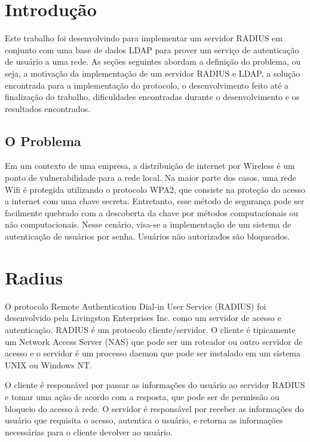 \section{Introdução}

Este trabalho foi desenvolvindo para implementar um servidor RADIUS em conjunto com uma
base de dados LDAP para prover um serviço de autenticação de usuário a uma rede.
As seções seguintes abordam a definição do problema, ou seja, a motivação da implementação
de um servidor RADIUS e LDAP, a solução encontrada para a implementação do protocolo, o
desenvolvimento feito até a finalização do trabalho, dificuldades encontradas durante o
desenvolvimento e os resultados encontrados.


\subsection{O Problema}

Em um contexto de uma empresa, a distribuição de internet por Wireless é um ponto de
vulnerabilidade para a rede local. Na maior parte dos casos, uma rede Wifi é protegida
utilizando o protocolo WPA2, que consiste na proteção do acesso a internet com uma
chave secreta. Entretanto, esse método de segurança pode ser facilmente quebrado com
a descoberta da chave por métodos computacionais ou não computacionais. Nesse cenário,
visa-se a implementação de um sistema de autenticação de usuários por senha. Usuários
não autorizados são bloqueados.

\section{Radius}

O protocolo Remote Authentication Dial-in User Service (RADIUS) foi desenvolvido pela
Livingston Enterprises Inc. como um servidor de acesso e autenticação. RADIUS é um
protocolo cliente/servidor. O cliente é tipicamente um Network Access Server (NAS) que
pode ser um roteador ou outro servidor de acesso e o servidor é um processo daemon que
pode ser instalado em um sistema UNIX ou Windows NT.

O cliente é responsável por passar as informações do usuário ao servidor RADIUS e tomar
uma ação de acordo com a resposta, que pode ser de permissão ou bloqueio do acesso à rede.
O servidor é responsável por receber as informações do usuário que requisita o acesso,
autentica o usuário, e retorna as informações necessárias para o cliente devolver ao usuário.

